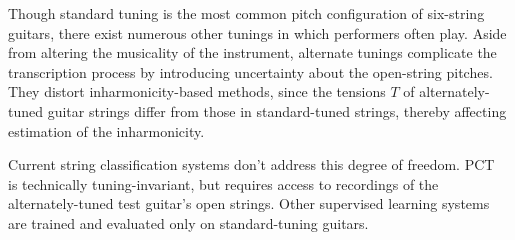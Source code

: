 \documentclass[12pt]{cmuthesis}
\begin{document}
Though standard tuning is the most common pitch configuration of six-string guitars, there exist numerous other tunings in which performers often play. Aside from altering the musicality of the instrument, alternate tunings complicate the transcription process by introducing uncertainty about the open-string pitches. They distort inharmonicity-based methods, since the tensions $T$ of alternately-tuned guitar strings differ from those in standard-tuned strings, thereby affecting estimation of the inharmonicity. 

Current string classification systems don't address this degree of freedom. PCT~\cite{barbanchoi2012} is technically tuning-invariant, but requires access to recordings of the alternately-tuned test guitar's open strings. Other supervised learning systems~\cite{kehling2014, dittmar2013, abesser2012} are trained and evaluated only on standard-tuning guitars.
\end{document}
